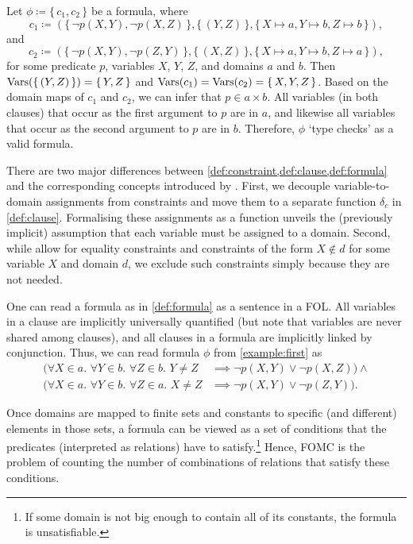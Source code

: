 \begin{example}\label{example:first}
  Let $\phi \coloneqq \{\, c_1, c_2 \,\}$ be a formula, where
  \[
    c_1 \coloneqq (\{\, \neg p(X, Y), \neg p(X, Z) \,\}, \{\, (Y, Z) \,\}, \{\, X \mapsto a, Y \mapsto b, Z \mapsto b \,\}),
  \]
  and
  \[
    c_2 \coloneqq (\{\, \neg p(X, Y), \neg p(Z, Y) \,\}, \{\, (X, Z) \,\}, \{\, X \mapsto a, Y \mapsto b, Z \mapsto a \,\}),
  \]
  for some predicate $p$, variables $X$, $Y$, $Z$, and domains $a$ and $b$. Then
  $\operatorname{Vars}(\{\, (Y, Z) \,\}) = \{\, Y, Z \,\}$ and
  $\operatorname{Vars}(c_{1}) = \operatorname{Vars}(c_{2}) = \{\, X, Y, Z \,\}$. Based on the domain maps of
  $c_{1}$ and $c_{2}$, we can infer that $p \in a \times b$. All variables (in
  both clauses) that occur as the first argument to $p$ are in $a$, and likewise
  all variables that occur as the second argument to $p$ are in $b$. Therefore,
  $\phi$ `type checks' as a valid formula.
\end{example}

There are two major differences between
\cref{def:constraint,def:clause,def:formula} and the corresponding concepts
introduced by \citet{DBLP:conf/ijcai/BroeckTMDR11}. First, we decouple
variable-to-domain assignments from constraints and move them to a separate
function $\delta_{c}$ in \cref{def:clause}. Formalising these assignments as a
function unveils the (previously implicit) assumption that each variable must be
assigned to a domain. Second, while \citet{DBLP:conf/ijcai/BroeckTMDR11} allow
for equality constraints and constraints of the form $X \not\in d$ for some
variable $X$ and domain $d$, we exclude such constraints simply because they are
not needed.

One can read a formula as in \cref{def:formula} as a sentence in a FOL\@.
All variables in a
clause are implicitly universally quantified (but note that variables are never
shared among clauses), and all clauses in a formula are implicitly linked by
conjunction. Thus, we can read formula $\phi$ from \cref{example:first} as
\begin{align*}
  (\forall X \in a\text{. }\forall Y \in b\text{. }\forall Z \in b\text{. }Y \ne Z &\implies \neg p(X, Y) \lor \neg p(X, Z)) \land \\
  (\forall X \in a\text{. }\forall Y \in b\text{. }\forall Z \in a\text{. }X \ne Z &\implies \neg p(X, Y) \lor \neg p(Z, Y)).
\end{align*}

Once domains are mapped to finite sets and constants to specific (and different)
elements in those sets, a formula can be viewed as a set of conditions that the
predicates (interpreted as relations) have to satisfy.\footnote{If some domain
  is not big enough to contain all of its constants, the formula is
  unsatisfiable.} Hence, FOMC is the problem of counting the number of
combinations of relations that satisfy these conditions.

